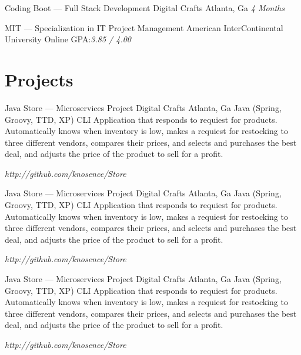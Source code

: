 \documentclass{resume-class/nadario_resume}
\begin{document}
        {Coding Boot --- Full Stack Development}
        {Digital Crafts}
        {Atlanta, Ga}
        {}{\textit{4 Months}}
        \vspace{.25cm}

        {MIT --- Specialization in IT Project Management}
        {American InterContinental University}
        {Online}
        {}{GPA:\textit{3.85 / 4.00}}
        \vspace{.25cm}

\section{Projects}
        {Java Store --- Microservices Project }
        {Digital Crafts}
        {Atlanta, Ga}
        {}{Java (Spring, Groovy, TTD, XP)}
          \indent CLI Application that responds to requiest for products. Automatically knows when
          inventory is low, makes a requiest for restocking to three different
          vendors, compares their prices, and selects and purchases the best
          deal, and adjusts the price of the product to sell for a profit.

        {}{\textit{http://github.com/knosence/Store}}
        \vspace{.25cm}

        {Java Store --- Microservices Project }
        {Digital Crafts}
        {Atlanta, Ga}
        {}{Java (Spring, Groovy, TTD, XP)}
          \indent CLI Application that responds to requiest for products. Automatically knows when
          inventory is low, makes a requiest for restocking to three different
          vendors, compares their prices, and selects and purchases the best
          deal, and adjusts the price of the product to sell for a profit.

        {}{\textit{http://github.com/knosence/Store}}
        \vspace{.25cm}

        {Java Store --- Microservices Project }
        {Digital Crafts}
        {Atlanta, Ga}
        {}{Java (Spring, Groovy, TTD, XP)}
          \indent CLI Application that responds to requiest for products. Automatically knows when
          inventory is low, makes a requiest for restocking to three different
          vendors, compares their prices, and selects and purchases the best
          deal, and adjusts the price of the product to sell for a profit.

        {}{\textit{http://github.com/knosence/Store}}
\end{document}
